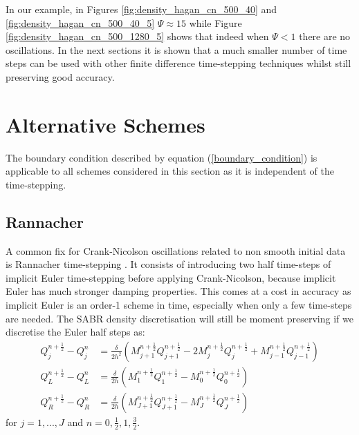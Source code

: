 \documentclass[]{rAMF2e}
\begin{document}
In our example, in Figures \ref{fig:density_hagan_cn_500_40} and \ref{fig:density_hagan_cn_500_40_5} $\Psi \approx 15$ while Figure \ref{fig:density_hagan_cn_500_1280_5} shows that indeed when $\Psi < 1$ there are no oscillations. In the next sections it is shown that a much smaller number of time steps can be used with other finite difference time-stepping techniques whilst still preserving good accuracy.

\section{Alternative Schemes}
The boundary condition described by equation (\ref{boundary_condition}) is applicable to all schemes considered in this section as it is independent of the time-stepping.

\subsection{Rannacher}
A common fix for Crank-Nicolson oscillations related to non smooth initial data is Rannacher time-stepping \citep{rannacher1984finite, GiCa2006}. It consists of introducing two half time-steps of implicit Euler time-stepping before applying Crank-Nicolson, because implicit Euler has much stronger damping properties. This comes at a cost in accuracy as implicit Euler is an order-1 scheme in time, especially when only a few time-steps are needed. 
The SABR density discretisation will still be moment preserving if we discretise the Euler half steps as:
\begin{align}\label{eqn_euler_1}
Q_j^{n+\frac{1}{2}}-Q_j^n &= \frac{\delta}{2h^2} \left(M_{j+1}^{n+\frac{1}{2}}Q_{j+1}^{n+\frac{1}{2}}-2M_j^{n+\frac{1}{2}}Q_j^{n+\frac{1}{2}}+M_{j-1}^{n+\frac{1}{2}}Q_{j-1}^{n+\frac{1}{2}} \right) \\
\label{eqn_euler_2}
Q_L^{n+\frac{1}{2}}-Q_L^n &= \frac{\delta}{2h} \left(M_{1}^{n+\frac{1}{2}}Q_{1}^{n+\frac{1}{2}}-M_0^{n+\frac{1}{2}}Q_0^{n+\frac{1}{2}}\right) \\
Q_R^{n+\frac{1}{2}}-Q_R^n &= \frac{\delta}{2h} \left(M_{J+1}^{n+\frac{1}{2}}Q_{J+1}^{n+\frac{1}{2}}-M_J^{n+\frac{1}{2}}Q_J^{n+\frac{1}{2}}\right) 
\end{align}
for $j=1,...,J$ and $n=0,\frac{1}{2}, 1, \frac{3}{2}$.
\end{document}

